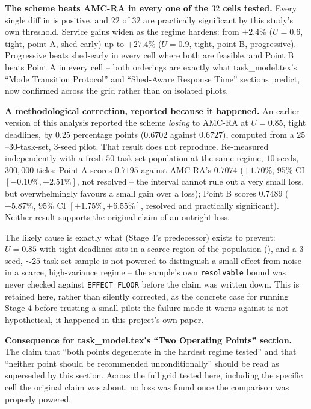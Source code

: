 \documentclass{article}
\begin{document}
\textbf{The scheme beats AMC-RA in every one of the $32$ cells tested.} Every
single diff in  is positive, and
$22$ of $32$ are practically significant by this study's own threshold.
Service gains widen as the regime hardens: from $+2.4\%$ ($U=0.6$, tight,
point A, shed-early) up to $+27.4\%$ ($U=0.9$, tight, point B, progressive).
Progressive beats shed-early in every cell where both are feasible, and Point B
beats Point A in every cell -- both orderings are exactly what
task\_model.tex's ``Mode Transition Protocol'' and ``Shed-Aware Response Time'' sections predict, now confirmed across the grid
rather than on isolated pilots.

\textbf{A methodological correction, reported because it happened.} An earlier
version of this analysis reported the scheme \emph{losing} to AMC-RA at
$U=0.85$, tight deadlines, by $0.25$ percentage points ($0.6702$ against
$0.6727$), computed from a $25$--$30$-task-set, $3$-seed pilot. That result
does not reproduce. Re-measured independently with a fresh $50$-task-set
population at the same regime, $10$ seeds, $300{,}000$ ticks: Point A scores
$0.7195$ against AMC-RA's $0.7074$ ($+1.70\%$, $95\%$ CI $[-0.10\%, +2.51\%]$,
not resolved -- the interval cannot rule out a very small loss, but overwhelmingly
favours a small gain over a loss); Point B scores $0.7489$ ($+5.87\%$, $95\%$ CI
$[+1.75\%, +6.55\%]$, resolved and practically significant). Neither result
supports the original claim of an outright loss.

The likely cause is exactly what  (Stage 4's predecessor)
exists to prevent: $U=0.85$ with tight deadlines sits in a scarce region of the
population (), and a $3$-seed, $\sim\!25$-task-set
sample is not powered to distinguish a small effect from noise in a scarce,
high-variance regime -- the sample's own \texttt{resolvable} bound was never
checked against \texttt{EFFECT\_FLOOR} before the claim was written down. This
is retained here, rather than silently corrected, as the concrete case for
running Stage 4 before trusting a small pilot: the failure mode it warns
against is not hypothetical, it happened in this project's own paper.

\textbf{Consequence for task\_model.tex's ``Two Operating Points'' section.} The
claim that ``both points degenerate in the hardest regime tested'' and that
``neither point should be recommended unconditionally'' should be read as
superseded by this section. Across the full grid tested here, including the
specific cell the original claim was about, no loss was found once the
comparison was properly powered.
\end{document}

